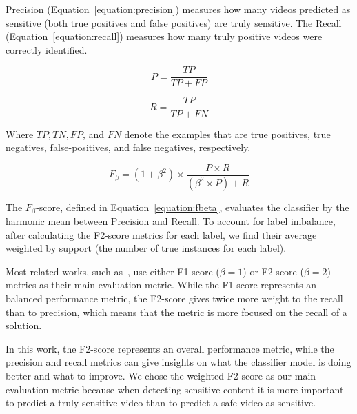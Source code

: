 
Precision (Equation~\ref{equation:precision}) measures how many videos predicted as sensitive (both true positives and false positives) are truly sensitive. The Recall (Equation~\ref{equation:recall})  measures how many truly positive videos were correctly identified.

\begin{multicols}{2}
  \begin{equation}
    \label{equation:precision}
    P = \frac{TP}{TP + FP}
  \end{equation}

  \begin{equation}
    \label{equation:recall}
    R = \frac{TP}{TP + FN}
  \end{equation}
  
\end{multicols}

Where $TP, TN, FP$, and $FN$ denote the examples that are true positives, true negatives, false-positives, and false negatives, respectively.

\begin{equation}
\label{equation:fbeta}
F_\beta = (1+\beta^2) \times \frac{P \times R}{(\beta^2 \times P) + R}
\end{equation}

The $F_\beta$-score, defined in Equation~\ref{equation:fbeta}, evaluates the classifier by the harmonic mean between Precision and Recall. To account for label imbalance, after calculating the F2-score metrics for each label, we find their average weighted by support (the number of true instances for each label). 

Most related works, such as~\cite{moreira2019multimodal,wehrmann2018adult,torres2018automatic}, use either F1-score ($\beta=1$) or F2-score ($\beta=2$) metrics as their main evaluation metric. While the F1-score represents an balanced performance metric, the F2-score gives twice more weight to the recall than to precision, which means that the metric is more focused on the recall of a solution.

In this work, the F2-score represents an overall performance metric, while the precision and recall metrics can give insights on what the classifier model is doing better and what to improve. We chose the weighted F2-score as our main evaluation metric because when detecting sensitive content it is more important to predict a truly sensitive video than to predict a safe video as sensitive.
